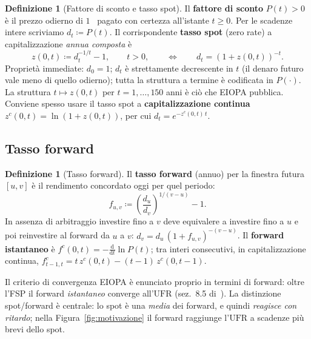 \documentclass[11pt,a4paper]{article}
\theoremstyle{plain}
\theoremstyle{definition}
\newtheorem{definizione}[teorema]{Definizione}
\theoremstyle{remark}
\newcommand{\UFR}{\mathrm{UFR}}
\newcommand{\defeq}{\coloneqq}
\begin{document}
\begin{definizione}[Fattore di sconto e tasso spot]
\label{def:sconto}
Il \textbf{fattore di sconto} $P(t)>0$ \`e il prezzo odierno di $1$~\texteuro{} pagato con
certezza all'istante $t \ge 0$. Per le scadenze intere scriviamo $d_t \defeq P(t)$. Il
corrispondente \textbf{tasso spot} (zero rate) a capitalizzazione \emph{annua composta} \`e
\begin{equation}
  z(0,t) \defeq d_t^{-1/t} - 1, \qquad t>0,
  \qquad\Longleftrightarrow\qquad
  d_t = (1+z(0,t))^{-t}.
  \label{eq:spot-disc}
\end{equation}
Propriet\`a immediate: $d_0=1$; $d_t$ \`e strettamente decrescente in $t$ (il denaro futuro
vale meno di quello odierno); tutta la struttura a termine \`e codificata in $P(\cdot)$. La
struttura $t\mapsto z(0,t)$ per $t=1,\ldots,150$ anni \`e ci\`o che EIOPA pubblica. Conviene
spesso usare il tasso spot a \textbf{capitalizzazione continua} $z^c(0,t)=\ln(1+z(0,t))$, per
cui $d_t=e^{-z^c(0,t)\,t}$.
\end{definizione}

\subsection{Tasso forward}

\begin{definizione}[Tasso forward]
\label{def:forward}
Il \textbf{tasso forward} (annuo) per la finestra futura $[u,v]$ \`e il rendimento concordato
oggi per quel periodo:
\[
  f_{u,v} \defeq \left(\frac{d_u}{d_v}\right)^{1/(v-u)} - 1 .
\]
In assenza di arbitraggio investire fino a $v$ deve equivalere a investire fino a $u$ e poi
reinvestire al forward da $u$ a $v$: $d_v = d_u\,(1+f_{u,v})^{-(v-u)}$. Il \textbf{forward
istantaneo} \`e $f^c(0,t) = -\frac{\mathrm d}{\mathrm dt}\ln P(t)$; tra interi consecutivi, in
capitalizzazione continua, $f^c_{t-1,t} = t\,z^c(0,t) - (t-1)\,z^c(0,t-1)$.
\end{definizione}

Il criterio di convergenza EIOPA \`e enunciato proprio in termini di forward: oltre l'FSP il
forward \emph{istantaneo} converge all'$\UFR$ (sez.~8.5 di~\cite{eiopa2026}). La
distinzione spot/forward \`e centrale: lo spot \`e una \emph{media} dei forward, e quindi
\emph{reagisce con ritardo}; nella Figura~\ref{fig:motivazione} il forward raggiunge l'$\UFR$
a scadenze pi\`u brevi dello spot.
\end{document}
